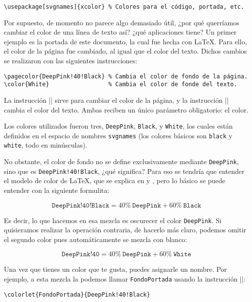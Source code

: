 \begin{lstlisting}[style=latex]
\usepackage[svgnames]{xcolor} % Colores para el código, portada, etc.
\end{lstlisting}

Por supuesto, de momento no parece algo demasiado útil, ¿por qué querríamos cambiar el color de una línea de texto así? ¿qué aplicaciones tiene? Un primer ejemplo es la portada de este documento, la cual fue hecha con \LaTeX{}. Para ello, el color de la página fue cambiado, al igual que el color del texto. Dichos cambios se realizaron con las siguientes instrucciones:

\begin{lstlisting}[style=latex]
\pagecolor{DeepPink!40!Black} % Cambia el color de fondo de la página.
\color{White}                 % Cambia el color de fonde del texto.
\end{lstlisting}

La instrucción |\pagecolor| sirve para cambiar el color de la página, y la instrucción |\color| cambia el color del texto. Ambas reciben un único parámetro obligatorio: el color.

Los colores utilizados fueron tres, \texttt{DeepPink}, \texttt{Black}, y \texttt{White}, los cuales están definidos en el espacio de nombres \texttt{svgnames} (los colores básicos son \texttt{black} y \texttt{white}, todo en minúsculas).

No obstante, el color de fondo no se define exclusivamente mediante \texttt{DeepPink}, sino que es \texttt{DeepPink!40!Black}, ¿qué significa? Para eso se tendría que entender el modelo de color de \LaTeX{}, que se explica en \cite{bib:latex_colors} y \cite{bib:xcolor_model}, pero lo básico se puede entender con la siguiente formulita:

\[
\texttt{DeepPink!40!Black} = 40\%~\texttt{DeepPink} + 60\%~\texttt{Black}
\]

Es decir, lo que hacemos en esa mezcla es oscurecer el color \texttt{DeepPink}. Si quisieramos realizar la operación contraria, de hacerlo más claro, podemos omitir el segundo color pues automáticamente se mezcla con blanco:

\[
\texttt{DeepPink!40} = 40\%~\texttt{DeepPink} + 60\%~\texttt{White}
\]

Una vez que tienes un color que te gusta, puedes asignarle un nombre. Por ejemplo, a esta mezcla la podemos llamar \texttt{FondoPortada} usando la instrucción ||:

\begin{lstlisting}[style=latex]
\colorlet{FondoPortada}{DeepPink!40!Black}
\end{lstlisting}


